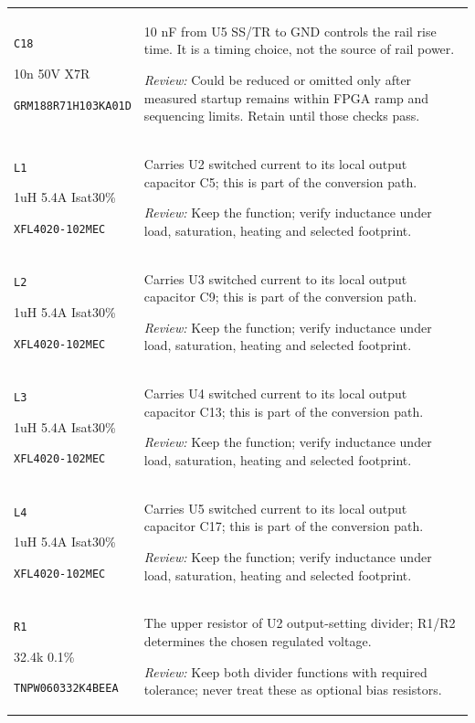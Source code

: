 \documentclass[10pt,a4paper]{article}
\begin{document}
\begin{longtable}{@{}P{46mm}P{117mm}@{}}
\nolinkurl{C18}\par 10n 50V X7R\par\scriptsize \nolinkurl{GRM188R71H103KA01D} & 10 nF from U5 SS/TR to GND controls the rail rise time. It is a timing choice, not the source of rail power.\par\smallskip\textit{Review:} Could be reduced or omitted only after measured startup remains within FPGA ramp and sequencing limits. Retain until those checks pass. \\
\nolinkurl{L1}\par 1uH 5.4A Isat30\%\par\scriptsize \nolinkurl{XFL4020-102MEC} & Carries U2 switched current to its local output capacitor C5; this is part of the conversion path.\par\smallskip\textit{Review:} Keep the function; verify inductance under load, saturation, heating and selected footprint. \\
\nolinkurl{L2}\par 1uH 5.4A Isat30\%\par\scriptsize \nolinkurl{XFL4020-102MEC} & Carries U3 switched current to its local output capacitor C9; this is part of the conversion path.\par\smallskip\textit{Review:} Keep the function; verify inductance under load, saturation, heating and selected footprint. \\
\nolinkurl{L3}\par 1uH 5.4A Isat30\%\par\scriptsize \nolinkurl{XFL4020-102MEC} & Carries U4 switched current to its local output capacitor C13; this is part of the conversion path.\par\smallskip\textit{Review:} Keep the function; verify inductance under load, saturation, heating and selected footprint. \\
\nolinkurl{L4}\par 1uH 5.4A Isat30\%\par\scriptsize \nolinkurl{XFL4020-102MEC} & Carries U5 switched current to its local output capacitor C17; this is part of the conversion path.\par\smallskip\textit{Review:} Keep the function; verify inductance under load, saturation, heating and selected footprint. \\
\nolinkurl{R1}\par 32.4k 0.1\%\par\scriptsize \nolinkurl{TNPW060332K4BEEA} & The upper resistor of U2 output-setting divider; R1/R2 determines the chosen regulated voltage.\par\smallskip\textit{Review:} Keep both divider functions with required tolerance; never treat these as optional bias resistors. \\

\end{longtable}
\end{document}
